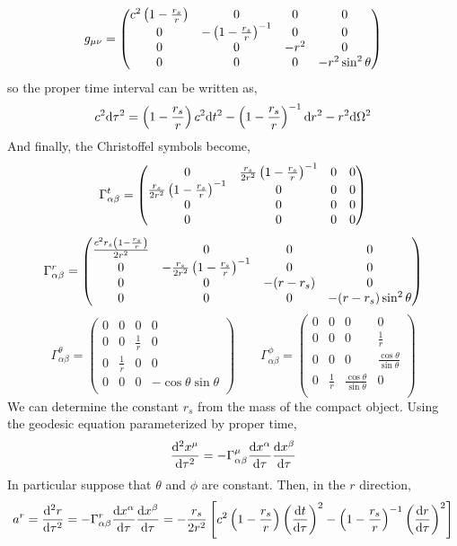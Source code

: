 \documentclass[11pt, a4paper]{article}
\begin{document}
\[ g_{\mu \nu}
= 
\begin{pmatrix}
c^2 \left(1 - \frac{r_s}{r} \right) & 0 & 0 & 0 \\
0 & - \left(1 - \frac{r_s}{r} \right)^{-1} & 0 & 0 \\
0 & 0 & - r^2 & 0 \\
0 & 0 & 0 & - r^2 \sin^2{\theta}
\end{pmatrix}
\]
so the proper time interval can be written as,
\[ c^2 \mathrm{d}\tau^2 = \left(1 - \frac{r_s}{r} \right) c^2 \mathrm{d}t^2 - \left(1 - \frac{r_s}{r} \right)^{-1} \mathrm{d}r^2 - r^2 \mathrm{d}\Omega^2 \]
And finally, the Christoffel symbols become,
\[
\Gamma^t_{\alpha \beta} = 
\begin{pmatrix}
0 & \frac{r_s}{2r^2}\left(1 - \frac{r_s}{r} \right)^{-1} & 0 & 0 \\
\frac{r_s}{2r^2}\left(1 - \frac{r_s}{r} \right)^{-1} & 0 & 0 & 0 \\
0 & 0 & 0 & 0 \\
0 & 0 & 0 & 0
\end{pmatrix}\]
\[
\Gamma^r_{\alpha \beta} = 
\begin{pmatrix}
\frac{c^2 r_s \left(1 - \frac{r_s}{r} \right)}{2 r^2} & 0 & 0 & 0 \\
0 & - \frac{r_s}{2r^2}\left(1 - \frac{r_s}{r} \right)^{-1} & 0 & 0 \\
0 & 0 & - (r - r_s) & 0 \\
0 & 0 & 0 & - (r - r_s) \sin^2{\theta}
\end{pmatrix}
\]
\[
\Gamma^\theta_{\alpha \beta} = 
\begin{pmatrix}
0 & 0 & 0 & 0 \\
0 & 0 & \frac{1}{r} & 0 \\
0 & \frac{1}{r} & 0 & 0 \\
0 & 0 & 0 & - \cos{\theta} \sin{\theta} \\
\end{pmatrix}
\quad \quad 
\Gamma^\phi_{\alpha \beta} = 
\begin{pmatrix}
0 & 0 & 0 & 0 \\
0 & 0 & 0 & \frac{1}{r} \\
0 & 0 & 0 & \frac{\cos{\theta}}{\sin{\theta}} \\
0 & \frac{1}{r} & \frac{\cos{\theta}}{\sin{\theta}} & 0 \\
\end{pmatrix}
\]
We can determine the constant $r_s$ from the mass  of the compact object. Using the geodesic equation parameterized by proper time,
\[ \frac{\mathrm{d}^{2} x^\mu}{\mathrm{d}\tau^{2}} = - \Gamma^\mu_{\alpha \beta} \frac{\mathrm{d}x^\alpha}{\mathrm{d}\tau} \frac{\mathrm{d}x^\beta}{\mathrm{d}\tau} \]
In particular suppose that $\theta$ and $\phi$ are constant. Then, in the $r$ direction,
\[ a^r = \frac{\mathrm{d}^{2} r}{\mathrm{d}\tau^{2}} = - \Gamma^r_{\alpha \beta} \frac{\mathrm{d}x^\alpha}{\mathrm{d}\tau} \frac{\mathrm{d}x^\beta}{\mathrm{d}\tau} = -\frac{r_s}{2r^2} \left[  c^2 \left(1 - \frac{r_s}{r} \right) \left( \frac{\mathrm{d}t}{\mathrm{d}\tau} \right)^2 - \left(1 - \frac{r_s}{r} \right)^{-1} \left( \frac{\mathrm{d}r}{\mathrm{d}\tau} \right)^2  \right] \]
\end{document}
